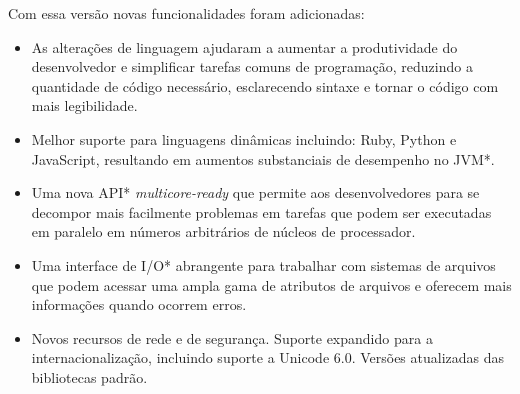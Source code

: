 Com essa versão novas funcionalidades foram adicionadas:

\begin{itemize}
  \item As alterações de linguagem ajudaram a aumentar a produtividade do desenvolvedor e simplificar tarefas comuns de programação, reduzindo a quantidade de código necessário, esclarecendo sintaxe e tornar o código com mais legibilidade.
  \item Melhor suporte para linguagens dinâmicas incluindo: Ruby, Python e JavaScript, resultando em aumentos substanciais de desempenho no JVM*.
  \item Uma nova API* {\it multicore-ready} que permite aos desenvolvedores para se decompor mais facilmente problemas em tarefas que podem ser executadas em paralelo em números arbitrários de núcleos de processador.
  \item Uma interface de I/O* abrangente para trabalhar com sistemas de arquivos que podem acessar uma ampla gama de atributos de arquivos e oferecem mais informações quando ocorrem erros.
  \item Novos recursos de rede e de segurança. Suporte expandido para a internacionalização, incluindo suporte a Unicode 6.0. Versões atualizadas das bibliotecas padrão.\\
\end{itemize}

